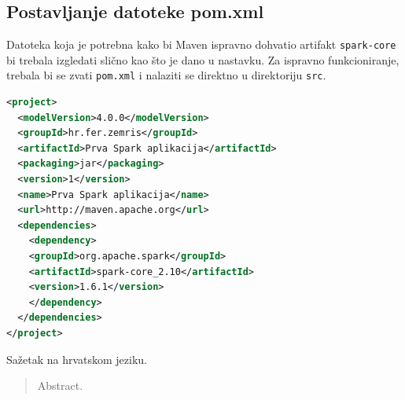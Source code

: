 \documentclass[times, utf8, zavrsni]{fer}
\begin{document}
\newpage
\begin{appendices}
\chapter{Postavljanje datoteke pom.xml}
\label{ch:datotekapomXML}
Datoteka koja je potrebna kako bi Maven ispravno dohvatio artifakt \texttt{spark-core} bi trebala izgledati slično kao što je dano u nastavku. Za ispravno funkcioniranje, trebala bi se zvati \texttt{pom.xml} i nalaziti se direktno u direktoriju \texttt{src}.
\begin{lstlisting}[language=XML]
<project>
  <modelVersion>4.0.0</modelVersion>
  <groupId>hr.fer.zemris</groupId>
  <artifactId>Prva Spark aplikacija</artifactId>
  <packaging>jar</packaging>
  <version>1</version>
  <name>Prva Spark aplikacija</name>	
  <url>http://maven.apache.org</url>
  <dependencies>
    <dependency>
	<groupId>org.apache.spark</groupId>
	<artifactId>spark-core_2.10</artifactId>
	<version>1.6.1</version>
    </dependency>
  </dependencies>
</project>
\end{lstlisting}
\end{appendices}

\begin{sazetak}
Sažetak na hrvatskom jeziku.

\end{sazetak}

\begin{abstract}
Abstract.

\end{abstract}
\end{document}
